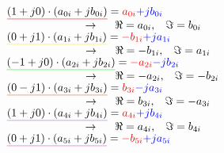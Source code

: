 \vspace{1cm}

$\mathunderline{red}{(1+j0) \cdot (a_{0i}+jb_{0i})} = \textcolor{red}{a_{0i}} \textcolor{blue}{+jb_{0i}}$\\

$\hspace{2.5cm}\rightarrow \hspace{0.5cm} \Re=a_{0i}, \hspace{0.3cm}\Im=b_{0i}$\\

$\mathunderline{yellow}{(0+j1) \cdot (a_{1i}+jb_{1i})} = \textcolor{red}{-b_{1i}} \textcolor{blue}{+ja_{1i}}$\\

$\hspace{2.5cm}\rightarrow \hspace{0.5cm} \Re=-b_{1i}, \hspace{0.3cm}\Im=a_{1i}$\\

$\mathunderline{green}{(-1+j0) \cdot (a_{2i}+jb_{2i})} = \textcolor{red}{-a_{2i}} \textcolor{blue}{-jb_{2i}}$\\

$\hspace{2.5cm}\rightarrow \hspace{0.5cm} \Re=-a_{2i}, \hspace{0.3cm}\Im=-b_{2i}$\\

$\mathunderline{cinnamon}{(0-j1) \cdot (a_{3i}+jb_{3i})} = \textcolor{red}{b_{3i}} \textcolor{blue}{-ja_{3i}}$\\

$\hspace{2.5cm}\rightarrow \hspace{0.5cm} \Re=b_{3i}, \hspace{0.3cm}\Im=-a_{3i}$\\

$\mathunderline{lila}{(1+j0) \cdot (a_{4i}+jb_{4i})} = \textcolor{red}{a_{4i}}\textcolor{blue}{+jb_{4i}}$\\

$\hspace{2.5cm}\rightarrow \hspace{0.5cm} \Re=a_{4i}, \hspace{0.3cm}\Im=b_{4i}$\\

$\mathunderline{pink}{(0+j1) \cdot (a_{5i}+jb_{5i})} = \textcolor{red}{-b_{5i}}\textcolor{blue}{+ja_{5i}}$\\

